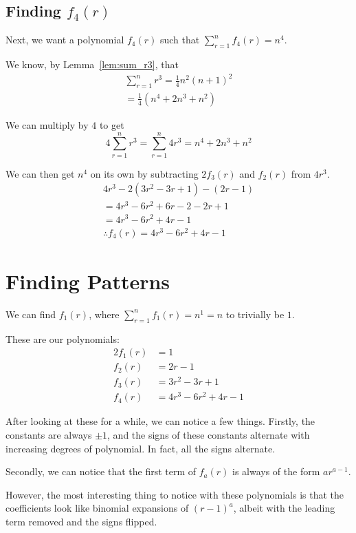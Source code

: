 \documentclass[a4paper]{article}
\newcommand{\sn}{\sum\limits_{r=1}^{n}}
\newcommand{\oo}[1]{\frac{1}{#1}}
\begin{document}
\subsection{Finding $f_4(r)$}

Next, we want a polynomial $f_4(r)$ such that $\sn f_4(r) = n^4$.

We know, by Lemma~\ref{lem:sum_r3}, that
\begin{gather*}
\sn r^3 = \oo{4}n^2(n + 1)^2\\[0.5em]
= \oo{4}\left(n^4 + 2n^3 + n^2\right)
\end{gather*}

We can multiply by $4$ to get $$4 \sn r^3 = \sn 4r^3 = n^4 + 2n^3 + n^2$$

We can then get $n^4$ on its own by subtracting $2f_3(r)$ and $f_2(r)$ from $4r^3$.
\begin{gather*}
4r^3 - 2\left(3r^2 - 3r + 1\right) - (2r - 1)\\[0.5em]
= 4r^3 - 6r^2 + 6r - 2 - 2r + 1\\[0.5em]
= 4r^3 - 6r^2 + 4r - 1\\[0.5em]
\therefore f_4(r) = 4r^3 - 6r^2 + 4r - 1
\end{gather*}

\section{Finding Patterns}

We can find $f_1(r)$, where $\sn f_1(r) = n^1 = n$ to trivially be $1$.

These are our polynomials:
\begin{alignat*}{2}
f_1(r) &= 1\\[0.5em]
f_2(r) &= 2r - 1\\[0.5em]
f_3(r) &= 3r^2 - 3r + 1\\[0.5em]
f_4(r) &= 4r^3 - 6r^2 + 4r - 1
\end{alignat*}

After looking at these for a while, we can notice a few things. Firstly, the constants are always $\pm 1$, and the signs of these constants alternate with increasing degrees of polynomial. In fact, all the signs alternate.

Secondly, we can notice that the first term of $f_a(r)$ is always of the form $ar^{a-1}$.

However, the most interesting thing to notice with these polynomials is that the coefficients look like binomial expansions of $(r-1)^a$, albeit with the leading term removed and the signs flipped.
\end{document}
